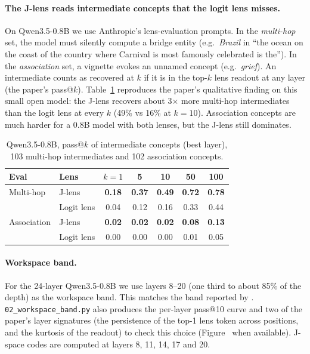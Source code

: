 \paragraph{The J-lens reads intermediate concepts that the logit lens misses.}
On Qwen3.5-0.8B we use Anthropic's lens-evaluation prompts. In the \emph{multi-hop} set, the
model must silently compute a bridge entity (e.g.\ \textit{Brazil} in ``the ocean on the coast
of the country where Carnival is most famously celebrated is the''). In the
\emph{association} set, a vignette evokes an unnamed concept (e.g.\ \textit{grief}). An
intermediate counts as recovered at $k$ if it is in the top-$k$ lens readout at any layer
(the paper's pass@$k$). Table~\ref{tab:lensq} reproduces the paper's qualitative finding on
this small open model: the J-lens recovers about 3$\times$ more multi-hop intermediates than
the logit lens at every $k$ (49\% vs 16\% at $k=10$). Association concepts are much harder
for a 0.8B model with both lenses, but the J-lens still dominates.

\begin{table}[h]\centering\small
\caption{Qwen3.5-0.8B, pass@$k$ of intermediate concepts (best layer), 103 multi-hop
intermediates and 102 association concepts.}
\label{tab:lensq}
\begin{tabular}{llccccc}
\toprule
Eval & Lens & $k=1$ & 5 & 10 & 50 & 100 \\
\midrule
Multi-hop & J-lens & \textbf{0.18} & \textbf{0.37} & \textbf{0.49} & \textbf{0.72} & \textbf{0.78} \\
          & Logit lens & 0.04 & 0.12 & 0.16 & 0.33 & 0.44 \\
Association & J-lens & \textbf{0.02} & \textbf{0.02} & \textbf{0.02} & \textbf{0.08} & \textbf{0.13} \\
            & Logit lens & 0.00 & 0.00 & 0.00 & 0.01 & 0.05 \\
\bottomrule
\end{tabular}
\end{table}

\paragraph{Workspace band.} For the 24-layer Qwen3.5-0.8B we use layers 8--20 (one third to
about 85\% of the depth) as the workspace band. This matches the band reported by
\citet{gurnee2026workspace}. \texttt{02\_workspace\_band.py} also produces the per-layer
pass@10 curve and two of the paper's layer signatures (the persistence of the top-1 lens
token across positions, and the kurtosis of the readout) to check this choice
(Figure~ when available). J-space codes are computed at layers 8, 11, 14, 17
and 20.


